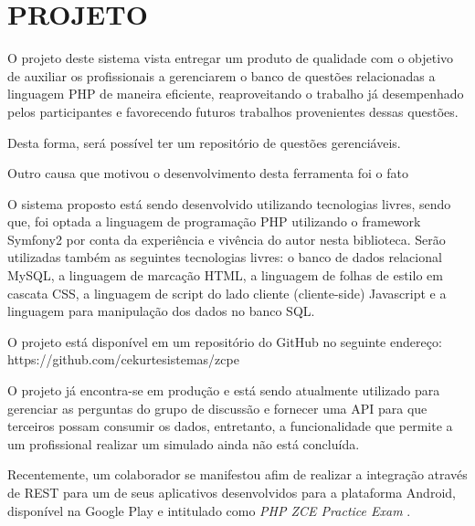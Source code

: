 \chapter{PROJETO}
\label{chp:projeto}
 
O projeto deste sistema vista entregar um produto de qualidade com o objetivo de
auxiliar os profissionais a gerenciarem o banco de questões relacionadas a
linguagem PHP de maneira eficiente, reaproveitando o trabalho já desempenhado
pelos participantes e favorecendo futuros trabalhos provenientes dessas
questões.

Desta forma, será possível ter um repositório de questões gerenciáveis.

Outro causa que motivou o desenvolvimento desta ferramenta foi o fato 

O sistema proposto está sendo desenvolvido utilizando tecnologias livres, sendo
que, foi optada a linguagem de programação PHP utilizando o framework Symfony2 
por conta da experiência e vivência do autor nesta biblioteca. Serão utilizadas 
também as seguintes tecnologias livres: o banco de dados relacional MySQL, a 
linguagem de marcação HTML, a linguagem de folhas de estilo em cascata CSS,  a
linguagem de script do lado cliente (cliente-side) Javascript e a linguagem 
para manipulação dos dados no banco SQL.

O projeto está disponível em um repositório do GitHub no
seguinte endereço: https://github.com/cekurtesistemas/zcpe

O projeto já encontra-se em produção e está sendo atualmente utilizado para 
gerenciar as perguntas do grupo de discussão e fornecer uma API para que 
terceiros possam consumir os dados, entretanto, a funcionalidade que permite a
um profissional realizar um simulado ainda não está concluída.

Recentemente, um colaborador se manifestou afim de realizar a integração 
através de REST para um de seus aplicativos desenvolvidos para a plataforma 
Android, disponível na Google Play e intitulado como \textit{PHP ZCE Practice 
Exam} \cite{googlePlayPHPZCEPracticeExam}.

